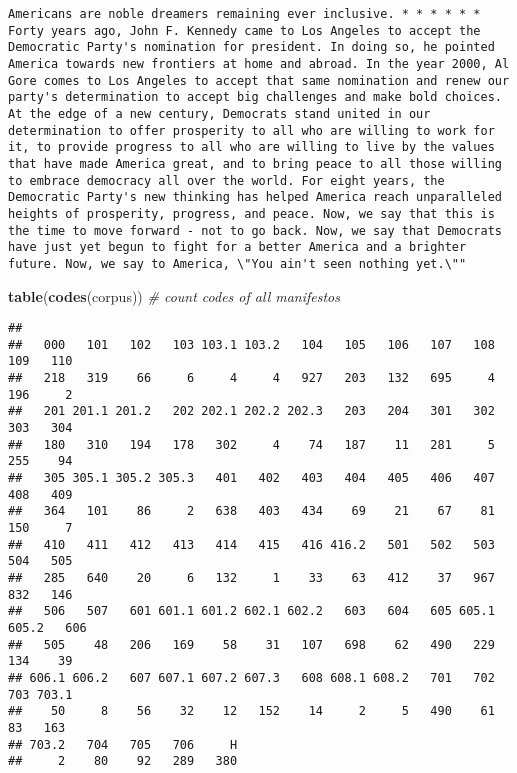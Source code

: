 \documentclass[
]{article}
\newenvironment{Shaded}{\begin{snugshade}}{\end{snugshade}}
\newcommand{\CommentTok}[1]{\textcolor[rgb]{0.56,0.35,0.01}{\textit{#1}}}
\newcommand{\FunctionTok}[1]{\textcolor[rgb]{0.13,0.29,0.53}{\textbf{#1}}}
\newcommand{\NormalTok}[1]{#1}
\begin{document}
\begin{verbatim}
Americans are noble dreamers remaining ever inclusive. * * * * * * Forty years ago, John F. Kennedy came to Los Angeles to accept the Democratic Party's nomination for president. In doing so, he pointed America towards new frontiers at home and abroad. In the year 2000, Al Gore comes to Los Angeles to accept that same nomination and renew our party's determination to accept big challenges and make bold choices. At the edge of a new century, Democrats stand united in our determination to offer prosperity to all who are willing to work for it, to provide progress to all who are willing to live by the values that have made America great, and to bring peace to all those willing to embrace democracy all over the world. For eight years, the Democratic Party's new thinking has helped America reach unparalleled heights of prosperity, progress, and peace. Now, we say that this is the time to move forward - not to go back. Now, we say that Democrats have just yet begun to fight for a better America and a brighter future. Now, we say to America, \"You ain't seen nothing yet.\""
\end{verbatim}

\begin{Shaded}
\begin{Highlighting}[]
\FunctionTok{table}\NormalTok{(}\FunctionTok{codes}\NormalTok{(corpus)) }\CommentTok{\# count codes of all manifestos}
\end{Highlighting}
\end{Shaded}

\begin{verbatim}
## 
##   000   101   102   103 103.1 103.2   104   105   106   107   108   109   110 
##   218   319    66     6     4     4   927   203   132   695     4   196     2 
##   201 201.1 201.2   202 202.1 202.2 202.3   203   204   301   302   303   304 
##   180   310   194   178   302     4    74   187    11   281     5   255    94 
##   305 305.1 305.2 305.3   401   402   403   404   405   406   407   408   409 
##   364   101    86     2   638   403   434    69    21    67    81   150     7 
##   410   411   412   413   414   415   416 416.2   501   502   503   504   505 
##   285   640    20     6   132     1    33    63   412    37   967   832   146 
##   506   507   601 601.1 601.2 602.1 602.2   603   604   605 605.1 605.2   606 
##   505    48   206   169    58    31   107   698    62   490   229   134    39 
## 606.1 606.2   607 607.1 607.2 607.3   608 608.1 608.2   701   702   703 703.1 
##    50     8    56    32    12   152    14     2     5   490    61    83   163 
## 703.2   704   705   706     H 
##     2    80    92   289   380
\end{verbatim}
\end{document}
